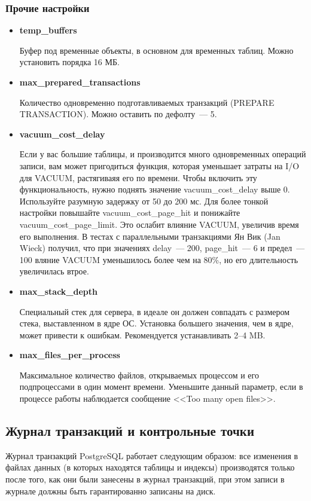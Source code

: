 \subsubsection{Прочие настройки}
\begin{itemize}
\item \textbf{temp\_buffers}

Буфер под временные объекты, в основном для временных таблиц.
Можно установить порядка 16 МБ.

\item \textbf{max\_prepared\_transactions}

Количество одновременно подготавливаемых транзакций (PREPARE TRANSACTION).
Можно оставить по дефолту~--- 5.

\item \textbf{vacuum\_cost\_delay} 

Если у вас большие таблицы, и производится много одновременных операций записи, 
вам может пригодиться функция, которая уменьшает затраты на I/O для VACUUM, растягиваяя его по времени. 
Чтобы включить эту функциональность, нужно поднять 
значение vacuum\_cost\_delay выше 0. Используйте разумную задержку от 50 до 200 мс. Для более тонкой настройки повышайте 
vacuum\_cost\_page\_hit и понижайте vacuum\_cost\_page\_limit. Это ослабит влияние VACUUM, увеличив время его выполнения. 
В тестах с параллельными транзакциями Ян Вик (Jan Wieck) получил, что при значениях delay~--- 200, page\_hit~--- 6 и предел~--- 
100 вляние VACUUM уменьшилось более чем на 80\%, но его длительность увеличилась втрое. 

\item \textbf{max\_stack\_depth}

Специальный стек для сервера, в идеале он должен совпадать с размером стека, выставленном в ядре ОС. 
Установка большего значения, чем в ядре, может привести к ошибкам.
Рекомендуется устанавливать 2--4 MB.

\item \textbf{max\_files\_per\_process}

Максимальное количество файлов, открываемых процессом и его подпроцессами в один момент времени.
Уменьшите данный параметр, если в процессе работы наблюдается сообщение <<Too many open files>>.
\end{itemize}


\subsection{Журнал транзакций и контрольные точки}
Журнал транзакций PostgreSQL работает следующим образом: все изменения в файлах данных (в которых находятся таблицы и 
индексы) производятся только после того, как они были занесены в журнал транзакций, при этом записи в журнале должны 
быть гарантированно записаны на диск.

